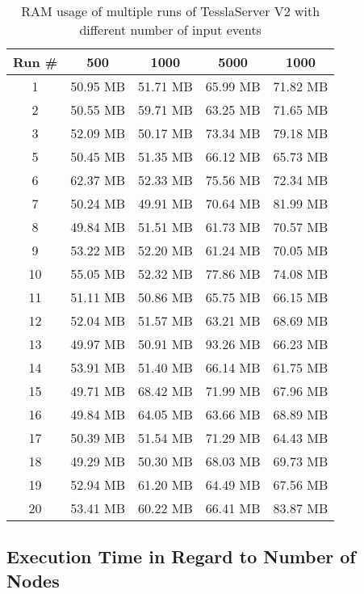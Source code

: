 \begin{table}[!htb]
  \centering
  \caption{RAM usage of multiple runs of TesslaServer V2 with different number of input events}
  \label{table:tessla_server_v2_events_ram_usage_data}
  \begin{tabular}{cllll}
    Run \# & \multicolumn{1}{c}{500} & \multicolumn{1}{c}{1000} & \multicolumn{1}{c}{5000} & \multicolumn{1}{c}{1000}\\ \hline
    1 & 50.95 MB & 51.71 MB & 65.99 MB & 71.82 MB \\
    2 & 50.55 MB & 59.71 MB & 63.25 MB & 71.65 MB \\
    3 & 52.09 MB & 50.17 MB & 73.34 MB & 79.18 MB \\
    5 & 50.45 MB & 51.35 MB & 66.12 MB & 65.73 MB \\
    6 & 62.37 MB & 52.33 MB & 75.56 MB & 72.34 MB \\
    7 & 50.24 MB & 49.91 MB & 70.64 MB & 81.99 MB \\
    8 & 49.84 MB & 51.51 MB & 61.73 MB & 70.57 MB \\
    9 & 53.22 MB & 52.20 MB & 61.24 MB & 70.05 MB \\
    10 &55.05 MB & 52.32 MB & 77.86 MB & 74.08 MB \\
    11 &51.11 MB & 50.86 MB & 65.75 MB & 66.15 MB \\
    12 &52.04 MB & 51.57 MB & 63.21 MB & 68.69 MB \\
    13 &49.97 MB & 50.91 MB & 93.26 MB & 66.23 MB \\
    14 &53.91 MB & 51.40 MB & 66.14 MB & 61.75 MB \\
    15 &49.71 MB & 68.42 MB & 71.99 MB & 67.96 MB \\
    16 &49.84 MB & 64.05 MB & 63.66 MB & 68.89 MB \\
    17 &50.39 MB & 51.54 MB & 71.29 MB & 64.43 MB \\
    18 &49.29 MB & 50.30 MB & 68.03 MB & 69.73 MB \\
    19 &52.94 MB & 61.20 MB & 64.49 MB & 67.56 MB \\
    20 &53.41 MB & 60.22 MB & 66.41 MB & 83.87 MB
  \end{tabular}
\end{table}

\clearpage

\subsection{Execution Time in Regard to Number of Nodes}
\label{sec:appendix:runtime_benchmark_data:ram_usage_events}

